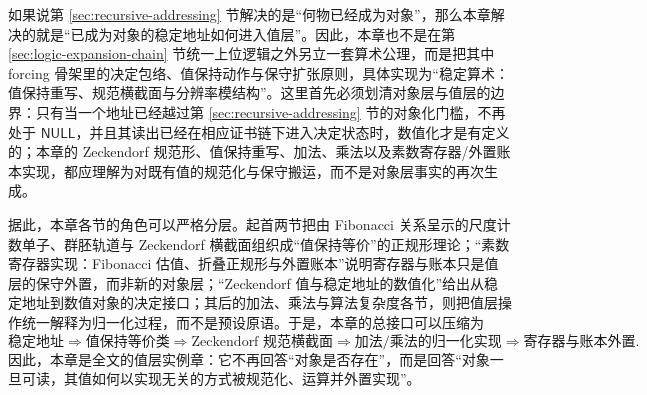 如果说第 \ref{sec:recursive-addressing} 节解决的是“何物已经成为对象”，那么本章解决的就是“已成为对象的稳定地址如何进入值层”。因此，本章也不是在第 \ref{sec:logic-expansion-chain} 节统一上位逻辑之外另立一套算术公理，而是把其中 forcing 骨架里的决定包络、值保持动作与保守扩张原则，具体实现为“稳定算术：值保持重写、规范横截面与分辨率模结构”。这里首先必须划清对象层与值层的边界：只有当一个地址已经越过第 \ref{sec:recursive-addressing} 节的对象化门槛，不再处于 \(\mathsf{NULL}\)，并且其读出已经在相应证书链下进入决定状态时，数值化才是有定义的；本章的 Zeckendorf 规范形、值保持重写、加法、乘法以及素数寄存器/外置账本实现，都应理解为对既有值的规范化与保守搬运，而不是对象层事实的再次生成。

据此，本章各节的角色可以严格分层。起首两节把由 Fibonacci 关系呈示的尺度计数单子、群胚轨道与 Zeckendorf 横截面组织成“值保持等价”的正规形理论；“素数寄存器实现：Fibonacci 估值、折叠正规形与外置账本”说明寄存器与账本只是值层的保守外置，而非新的对象层；“Zeckendorf 值与稳定地址的数值化”给出从稳定地址到数值对象的决定接口；其后的加法、乘法与算法复杂度各节，则把值层操作统一解释为归一化过程，而不是预设原语。于是，本章的总接口可以压缩为
\[
\text{稳定地址}
\Longrightarrow
\text{值保持等价类}
\Longrightarrow
\text{Zeckendorf 规范横截面}
\Longrightarrow
\text{加法/乘法的归一化实现}
\Longrightarrow
\text{寄存器与账本外置}.
\]
因此，本章是全文的值层实例章：它不再回答“对象是否存在”，而是回答“对象一旦可读，其值如何以实现无关的方式被规范化、运算并外置实现”。
